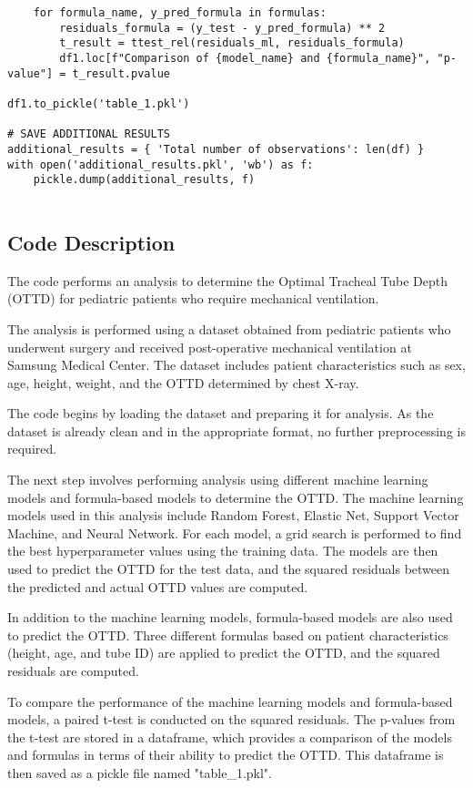 \documentclass[11pt]{article}
\begin{document}
\begin{verbatim}
    for formula_name, y_pred_formula in formulas:
        residuals_formula = (y_test - y_pred_formula) ** 2
        t_result = ttest_rel(residuals_ml, residuals_formula)
        df1.loc[f"Comparison of {model_name} and {formula_name}", "p-value"] = t_result.pvalue

df1.to_pickle('table_1.pkl')

# SAVE ADDITIONAL RESULTS
additional_results = { 'Total number of observations': len(df) }
with open('additional_results.pkl', 'wb') as f:
    pickle.dump(additional_results, f)


\end{verbatim}

\subsection{Code Description}

The code performs an analysis to determine the Optimal Tracheal Tube Depth (OTTD) for pediatric patients who require mechanical ventilation. 

The analysis is performed using a dataset obtained from pediatric patients who underwent surgery and received post-operative mechanical ventilation at Samsung Medical Center. The dataset includes patient characteristics such as sex, age, height, weight, and the OTTD determined by chest X-ray. 

The code begins by loading the dataset and preparing it for analysis. As the dataset is already clean and in the appropriate format, no further preprocessing is required. 

The next step involves performing analysis using different machine learning models and formula-based models to determine the OTTD. The machine learning models used in this analysis include Random Forest, Elastic Net, Support Vector Machine, and Neural Network. For each model, a grid search is performed to find the best hyperparameter values using the training data. The models are then used to predict the OTTD for the test data, and the squared residuals between the predicted and actual OTTD values are computed. 

In addition to the machine learning models, formula-based models are also used to predict the OTTD. Three different formulas based on patient characteristics (height, age, and tube ID) are applied to predict the OTTD, and the squared residuals are computed. 

To compare the performance of the machine learning models and formula-based models, a paired t-test is conducted on the squared residuals. The p-values from the t-test are stored in a dataframe, which provides a comparison of the models and formulas in terms of their ability to predict the OTTD. This dataframe is then saved as a pickle file named "table\_1.pkl". 
\end{document}
